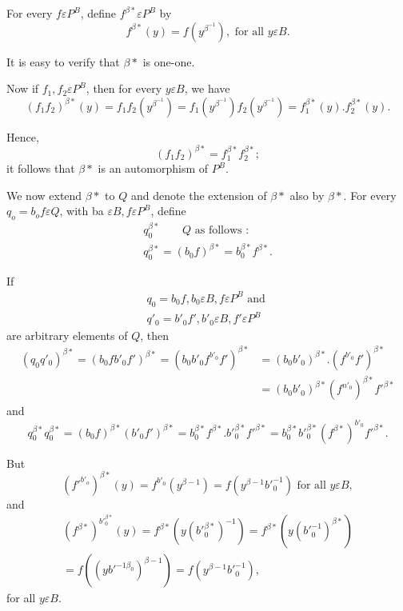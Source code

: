 For every $f \varepsilon P^B$, define $f^{\beta*} \varepsilon P^B$ by 
$$
f^{\beta *} (y) = f(y^{\beta^{-1}}),  \text{ for all } y \varepsilon B.
$$

It is easy to verify that $\beta*$ is one-one.

Now if $f_1, f_2 \varepsilon P^B$, then for every $y \varepsilon B$, we have 
$$
(f_1f_2)^{\beta*}(y) = f_1 f_2 (y^{\beta^{-1}}) = f_1(y^{\beta^{-1}})
f_2(y^{\beta^{-1}}) =  f^{\beta*}_1 (y).  f_2^{\beta*}(y). 
$$

Hence, 
$$
(f_1 f_2)^{\beta*} = f^{\beta*}_1 f^{\beta*}_2 ;
$$
it follows that ${\beta*}$ is an automorphism of $P^B$. 

We now extend ${\beta*}$ to $Q$ and denote the extension of ${\beta*}$
also by ${\beta*}$. For every $q_o = b_o f \varepsilon Q$, with ba
$\varepsilon B, f \varepsilon P^B$, define  
\begin{gather*}
  q^{\beta*}_0 \qquad Q \text{ as follows }:\\
  q^{\beta*}_0 = (b_0 f)^{\beta*} = b^{\beta*}_0 f^{\beta*}.
\end{gather*} 

 If
\begin{gather*}
  q_0 = b_0 f, b_0 \varepsilon B, f \varepsilon P^B \text{ and }\\
  q'_0 = b'_0 f', b'_0 \varepsilon B, f' \varepsilon P^B
\end{gather*}
are arbitrary elements of $Q$, then 
\begin{align*}
  (q_0q'_0)^{\beta*} = (b_0 fb'_0 f')^{\beta*} = (b_0 b'_0
  f^{b'_0}f')^{\beta*}& = (b_0 b'_0)^{\beta*}
 .  (f^{b'_0}f')^{\beta*}\\ 
  & = (b_0 b'_0)^{\beta*} (f^{n'_0})^{\beta*} f'^{{\beta*}}
\end{align*}
and 
$$
q^{\beta*}_0 q^{\beta*}_0 = (b_0 f)^{\beta*} (b'_0 f ')^{\beta*} =
b^{\beta*}_0 f^{\beta*}. b'^{\beta*}_0 f'^{\beta*} = b^{\beta*}_0
b'^{\beta*}_0 (f^{\beta*})^{b'_0}f'^{\beta*}. 
$$

But 
$$
  (f'^{b'_o})^{\beta*} (y) = f^{b'_0}(y^{\beta-1}) = f(y^{\beta-1}
  b'^{-1}_0) \text{ for all } y \varepsilon B,
$$
and
\begin{multline*}
  (f^{\beta*})^{b'^{\beta*}_0}(y) = f^{\beta*} (y(b'^{{\beta*}}_0)^{-1})
  = f^{\beta*} (y(b'^{-1}_0)^{\beta*})\\ 
  = f((yb'^{-1
    {\beta}_0})^{\beta-1}) = f(y^{\beta-1}b'^{-1}_0),
\end{multline*}
for all $y \varepsilon B$.

